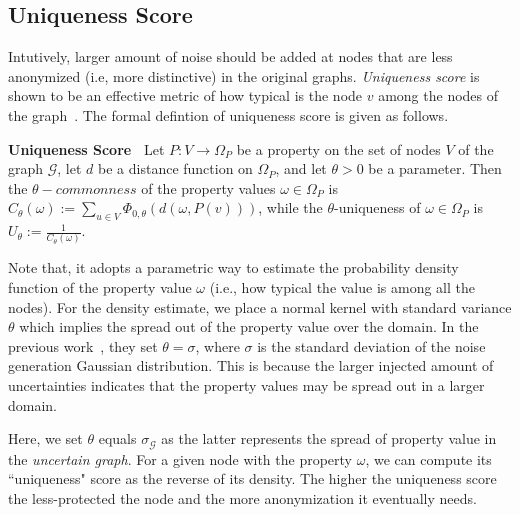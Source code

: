 \subsection{Uniqueness Score}
Intutively, larger amount of noise should be added at nodes that are less anonymized (i.e, more distinctive) in the original graphs. \emph{Uniqueness score} is shown to be an effective metric of how typical is the node $v$ among the nodes of the graph~\cite{Boldi_Injecting_2012}. The formal defintion of uniqueness score is given as follows. 
\begin{definition}
    \textbf{Uniqueness Score~\cite{Boldi_Injecting_2012}}
     Let $P:V \rightarrow  \Omega_{P}$ be a property on the set of nodes $V$ of the graph $\mathcal{G}$, let $d$ be a distance function on $\Omega_{P}$, and let $\theta >0$  be a parameter. 
  Then the $\theta-commonness$ of the property values $\omega \in \Omega_{P}$ is $C_{\theta}(\omega):= \sum_{u \in V} \Phi_{0,\theta}(d(\omega, P(v)))$,   
while the $\theta$-uniqueness of $\omega \in \Omega_{P}$ is $U_{\theta}:= \frac{1}{C_{\theta}(\omega)}$. 
\end{definition} 

Note that, it adopts a parametric way to estimate the probability density function of the property value $\omega$ (i.e., how typical the value is among all the nodes). For the density estimate, we place a normal kernel with standard variance 
$\theta$ which implies the spread out of the property value over the domain. In the previous work~\cite{Boldi_Injecting_2012}, they set $\theta=\sigma$, where $\sigma$ is the standard deviation of the noise generation Gaussian distribution. This is because the larger injected amount of uncertainties indicates that the property values may be spread out in a larger domain. 

Here, we set $\theta$ equals $\sigma_{\mathcal{G}}$ as the latter represents the spread of property value in the \emph{uncertain graph}. For a given node with the property $\omega$, we can compute its ``uniqueness" score as the reverse of its density. The higher the uniqueness score the less-protected the node and the more anonymization it eventually needs.






